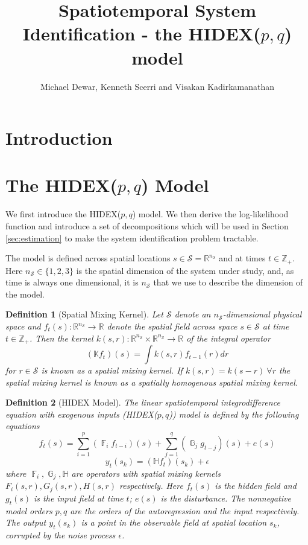 \documentclass{IEEEtran}
\title{Spatiotemporal System Identification - the HIDEX($p,q$) model}
\author{Michael Dewar, Kenneth Scerri and Visakan Kadirkamanathan}
\DeclareMathOperator{\F}{\mathbb{F}}
\DeclareMathOperator{\G}{\mathbb{G}}
\DeclareMathOperator{\onto}{\rightarrow}
\newtheorem{definition}{Definition}
\begin{document}
\maketitle

\section{Introduction}

\section{The HIDEX($p,q$) Model}
\label{sec:model}

We first introduce the HIDEX($p,q$) model. We then derive the log-likelihood function and introduce a set of decompositions which will be used in Section \ref{sec:estimation} to make the system identification problem tractable. 

The model is defined across spatial locations $s \in \mathcal{S} = \mathbb{R}^{n_\mathcal{S}}$ and at times $t \in \mathbb{Z}_+$. Here $n_\mathcal{S} \in \{1,2,3\}$ is the spatial dimension of the system under study, and, as time is always one dimensional, it is $n_\mathcal{S}$ that we use to describe the dimension of the model. 

\begin{definition}[Spatial Mixing Kernel]
	Let $\mathcal{S}$ denote an $n_\mathcal{S}$-dimensional physical space and $f_t(s): \mathbb{R}^{n_\mathcal{S}} \onto \mathbb{R}$ denote the spatial field across space $s \in \mathcal{S}$ at time $t \in \mathbb{Z}_+$. Then the kernel $k(s,r): \mathbb{R}^{n_\mathcal{S}} \times \mathbb{R}^{n_\mathcal{S}} \onto \mathbb{R}$ of the integral operator
	\begin{equation}
		(\mathbb{K}f_t)(s) = \int k(s,r) f_{t-1}(r) dr
	\end{equation}
	for $r \in \mathcal{S}$ is known as a \emph{spatial mixing kernel}. If $k(s,r) = k(s-r) ~ \forall r$ the spatial mixing kernel is known as a \emph{spatially homogenous spatial mixing kernel}.
\end{definition}

\begin{definition}[HIDEX Model]
	\label{def:hidex}
	The linear spatiotemporal integrodifference equation with exogenous inputs (HIDEX($p,q$)) model is defined by the following equations
	\begin{equation}
		\label{eqn:hidex-hidden}
	f_t(s)= \sum_{i=1}^{p} (\F_i f_{t-i})(s) + \sum_{j=1}^{q}(\G_j g_{t-j})(s)+e(s)
	\end{equation}
	\begin{equation}
	\label{eqn:hidex-obs}
	y_t(s_k) = (\mathbb{H}f_t)(s_k) + \epsilon
	\end{equation}
	where $\F_i,\G_j,\mathbb{H}$ are operators with spatial mixing kernels $F_i(s,r), G_j(s,r), H(s,r)$ respectively. Here $f_t(s)$ is the hidden field and $g_{t}(s)$ is the input field at time $t$; $e(s)$ is the disturbance. The nonnegative model orders $p,q$ are the orders of the autoregression and the input respectively. The output $y_t(s_k)$ is a point in the observable field at spatial location $s_k$, corrupted by the noise process $\epsilon$.
\end{definition}
\end{document}

